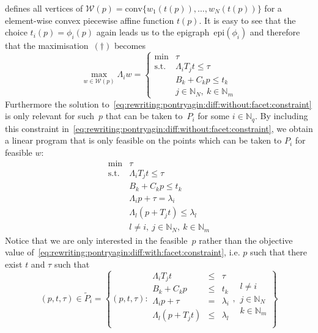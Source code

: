 \documentclass[smallextended]{svjour3}       %
\numberwithin{equation}{section}
\providecommand{\conv}{\text{conv}}
\providecommand{\epi}{\text{epi}}
\begin{document}
%
defines all vertices of $\mathcal W(p) = \conv\{w_1(t(p)),\dots,w_N(t(p))\}$ for a element-wise convex piecewise affine function $t(p)$.
%
It is easy to see that the choice $t_i(p)=\phi_i(p)$ again leads us to the epigraph~$\epi(\phi_i)$ and therefore that the maximisation~$(\dagger)$ becomes
%
\begin{equation}\label{eq:rewriting:pontryagin:diff:without:facet:constraint}
  \max_{w\in\mathcal W(p)}\Lambda_i w = \left\{\begin{array}{rl}
  \min& \tau\\
  \text{s.t.}& \Lambda_iT_jt\leq\tau\\
  & B_k+C_k p \leq t_k\\
  & j\in\mathbb N_N, \ k\in\mathbb N_m 
  \end{array}\right.
\end{equation}
%
Furthermore the solution to~\eqref{eq:rewriting:pontryagin:diff:without:facet:constraint} is only relevant for such~$p$ that can be taken to~$P_i$ for some $i\in\mathbb N_q$.
%
By including this constraint in~\eqref{eq:rewriting:pontryagin:diff:without:facet:constraint}, we obtain a linear program that is only feasible on the points which can be taken to $P_i$ for feasible $w$:
%
\begin{equation}\label{eq:rewriting:pontryagin:diff:with:facet:constraint}
  \begin{array}{rl}
  \min& \tau\\
  \text{s.t.}& \Lambda_iT_jt\leq\tau\\
  & B_k+C_k p\leq t_k\\
  &\Lambda_i p + \tau=\lambda_i\\
  &\Lambda_l(p + T_jt)\leq\lambda_l\\
  &l\neq i, \ j\in\mathbb N_N, \ k\in\mathbb N_m 
  \end{array}
\end{equation}
%
Notice that we are only interested in the feasible~$p$ rather than the objective value of~\eqref{eq:rewriting:pontryagin:diff:with:facet:constraint}, i.e. $p$ such that there exist $t$ and $\tau$ such that 
%
\begin{equation}
  (p,t,\tau)\in\tilde P_i=\left\{(p,t,\tau):\begin{array}{rcl}
  \Lambda_iT_jt&\leq&\tau\\
  B_k+C_k p&\leq& t_k\\
  \Lambda_i p + \tau&=&\lambda_i\\
  \Lambda_l(p + T_jt)&\leq&\lambda_l\\
  \end{array},\begin{array}{l}
   l\neq i\\
   j\in\mathbb N_N\\
   k\in\mathbb N_m
   \end{array}
   \right\}
\end{equation}
\end{document}
